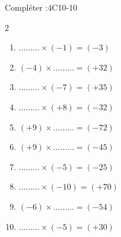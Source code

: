\begin{EXO}{Compléter :}{4C10-10}
\begin{multicols}{2}
\begin{enumerate}[itemsep=2em]
	\item \begin{minipage}[t]{\linewidth} $ \ldots\ldots\ldots \times (-1) = (-3) $ \end{minipage}
	\item \begin{minipage}[t]{\linewidth} $ (-4) \times \ldots\ldots\ldots = (+32) $ \end{minipage}
	\item \begin{minipage}[t]{\linewidth} $ \ldots\ldots\ldots \times (-7) = (+35) $ \end{minipage}
	\item \begin{minipage}[t]{\linewidth} $ \ldots\ldots\ldots \times (+8) = (-32) $ \end{minipage}
	\item \begin{minipage}[t]{\linewidth} $ (+9) \times \ldots\ldots\ldots = (-72) $ \end{minipage}
	\item \begin{minipage}[t]{\linewidth} $ (+9) \times \ldots\ldots\ldots = (-45) $ \end{minipage}
	\item \begin{minipage}[t]{\linewidth} $ \ldots\ldots\ldots \times (-5) = (-25) $ \end{minipage}
	\item \begin{minipage}[t]{\linewidth} $ \ldots\ldots\ldots \times (-10) = (+70) $ \end{minipage}
	\item \begin{minipage}[t]{\linewidth} $ (-6) \times \ldots\ldots\ldots = (-54) $ \end{minipage}
	\item \begin{minipage}[t]{\linewidth} $ \ldots\ldots\ldots \times (-5) = (+30) $ \end{minipage}
\end{enumerate}
\end{multicols}
\end{EXO}


